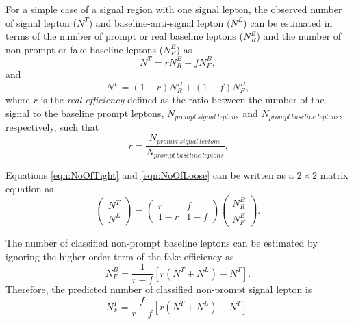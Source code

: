 For a simple case of a signal region with one signal lepton, the observed number of signal lepton ($N^{T}$) and baseline-anti-signal lepton ($N^{L}$) can be estimated in terms of the number of prompt or real baseline leptons ($N^{B}_{R}$) and the number of non-prompt or fake baseline leptons ($N^{B}_{F}$) as
\begin{equation}
N^{T} = rN^{B}_{R}+fN^{B}_{F},
\label{eqn:NoOfTight}
\end{equation}
and 
\begin{equation}
N^{L} = (1-r)N^{B}_{R} + (1-f)N^{B}_{F},
\label{eqn:NoOfLoose}
\end{equation}
where $r$ is the \textit{real efficiency} defined as the ratio between the number of the signal to the baseline prompt leptons, $N_{prompt~signal~leptons}$ and $N_{prompt~baseline~leptons}$, respectively, such that 
\begin{equation} 
    r=\frac{N_{prompt~signal~leptons}}{N_{prompt~baseline~leptons}}.
\end{equation}

Equations \ref{eqn:NoOfTight} and \ref{eqn:NoOfLoose} can be written as a $2 \times 2$ matrix equation as
\begin{equation}
    \begin{pmatrix} N^{T} \\ N^{L} \end{pmatrix} =  \begin{pmatrix} r & f \\ 1-r & 1-f \end{pmatrix} \begin{pmatrix} N^{B}_{R} \\ N^{B}_{F}\end{pmatrix}.
    \label{eqn:RealFakeLepton}
\end{equation}

The number of classified non-prompt baseline leptons can be estimated by ignoring the higher-order term of the fake efficiency as
\begin{equation}
    N_{F}^{B} =  \frac{1}{r-f}[r(N^{T}+N^{L})-N^{T}].
    \label{eqn:NfakeBaseline}
\end{equation}
Therefore, the predicted number of classified non-prompt signal lepton is 
\begin{equation}
    N_{F}^{T} =  \frac{f}{r-f}[r(N^{T}+N^{L})-N^{T}].
\label{eqn:NfakeSignal}
\end{equation}

